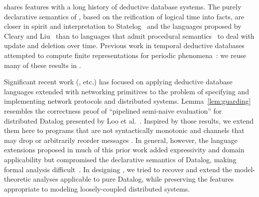 \lang shares features with a long history of deductive database systems.
The purely declarative semantics of \lang, based on the reification of logical time into
facts, are closer in spirit and interpretation to  Statelog~\cite{statelog} and
the languages proposed by Cleary and Liu~\cite{harmful,deductiveupdates,starlog} than
to languages that admit procedural semantics~\cite{ldl, glue-nail} to deal with update 
and deletion over time.
Previous work in temporal deductive databases attempted to compute finite representations for periodic phenomena~\cite{tdd-infinite}: we reuse many of these results in \lang.

Significant recent work (\cite{boom,Belaramani:2009,Chu:2007,Loo2009-CACM}, etc.) has focused on applying deductive database languages extended with networking 
primitives to the problem of specifying and implementing network protocols and distributed systems.  Lemma~\ref{lem:guarding} resembles the  correctness proof of ``pipelined
semi-naive evaluation'' for distributed Datalog presented by Loo et al.~\cite{loo-sigmod06}.
Inspired by those results, we extend them here to programs that are not syntactically 
monotonic and channels that may drop or arbitrarily reorder messages .
In general, however, the language extensions 
proposed in much of this prior work added
expressivity and domain applicability but compromised the declarative
semantics of Datalog, making formal analysis difficult~\cite{Mao2009, navarro}.
In designing \lang, we tried to recover and extend the model-theoretic analyses applicable
to pure Datalog, while preserving the features appropriate to modeling loosely-coupled
distributed systems.

